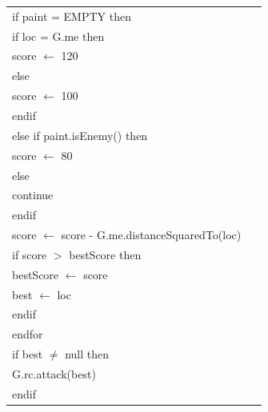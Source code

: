\documentclass{article}
\newenvironment{pseudobox}
{
\centering
\begin{longtable}{|p{0.94\linewidth}|}
\hline
}
{
\\ \hline
\end{longtable}
\vspace{0.05cm}
}
\begin{document}
\begin{pseudobox}
\hspace*{2em} if paint = EMPTY then \\
\hspace*{3em} if loc = G.me then \\
\hspace*{4em} score $\leftarrow$ 120 \\
\hspace*{3em} else \\
\hspace*{4em} score $\leftarrow$ 100 \\
\hspace*{3em} endif \\
\hspace*{2em} else if paint.isEnemy() then \\
\hspace*{3em} score $\leftarrow$ 80 \\
\hspace*{2em} else \\
\hspace*{3em} continue \\
\hspace*{2em} endif \\

\hspace*{2em} score $\leftarrow$ score - G.me.distanceSquaredTo(loc) \\

\hspace*{2em} if score $>$ bestScore then \\
\hspace*{3em} bestScore $\leftarrow$ score \\
\hspace*{3em} best $\leftarrow$ loc \\
\hspace*{2em} endif \\
\hspace*{1em} endfor \\

\hspace*{1em} if best $\neq$ null then \\
\hspace*{2em} G.rc.attack(best) \\
\hspace*{1em} endif
\end{pseudobox}
\end{document}
